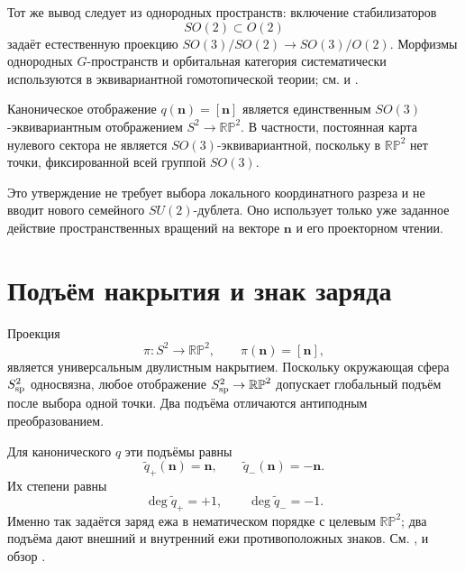 Тот же вывод следует из однородных пространств: включение стабилизаторов
\begin{equation}
 SO(2)\subset O(2)
\end{equation}
задаёт естественную проекцию
$SO(3)/SO(2)\to SO(3)/O(2)$. Морфизмы однородных $G$-пространств и
орбитальная категория систематически используются в эквивариантной
гомотопической теории; см.  и
.

\begin{theorem}
Каноническое отображение $q(\mathbf n)=[\mathbf n]$ является единственным
$SO(3)$-эквивариантным отображением
$S^2\to\mathbb{RP}^2$. В частности, постоянная карта нулевого сектора не
является $SO(3)$-эквивариантной, поскольку в $\mathbb{RP}^2$ нет точки,
фиксированной всей группой $SO(3)$.
\end{theorem}

Это утверждение не требует выбора локального координатного разреза и не
вводит нового семейного $SU(2)$-дублета. Оно использует только уже заданное
действие пространственных вращений на векторе $\mathbf n$ и его
проекторном чтении.

\section{Подъём накрытия и знак заряда}

Проекция
\begin{equation}
 \pi:S^2\longrightarrow\mathbb{RP}^2,
 \qquad \pi(\mathbf n)=[\mathbf n],
\end{equation}
является универсальным двулистным накрытием. Поскольку окружающая сфера
$S^2_{\rm sp}$ односвязна, любое отображение
$S^2_{\rm sp}\to\mathbb{RP}^2$ допускает глобальный подъём после выбора
одной точки. Два подъёма отличаются антиподным преобразованием.

Для канонического $q$ эти подъёмы равны
\begin{equation}
 \widetilde q_+(\mathbf n)=\mathbf n,
 \qquad
 \widetilde q_-(\mathbf n)=-\mathbf n.
 \label{eq:v5-spin-bridge-two-lifts}
\end{equation}
Их степени равны
\begin{equation}
 \deg\widetilde q_+=+1,
 \qquad
 \deg\widetilde q_-=-1.
 \label{eq:v5-spin-bridge-lift-degrees}
\end{equation}
Именно так задаётся заряд ежа в нематическом порядке с целевым
$\mathbb{RP}^2$; два подъёма дают внешний и внутренний ежи противоположных
знаков. См. ,  и обзор
.

